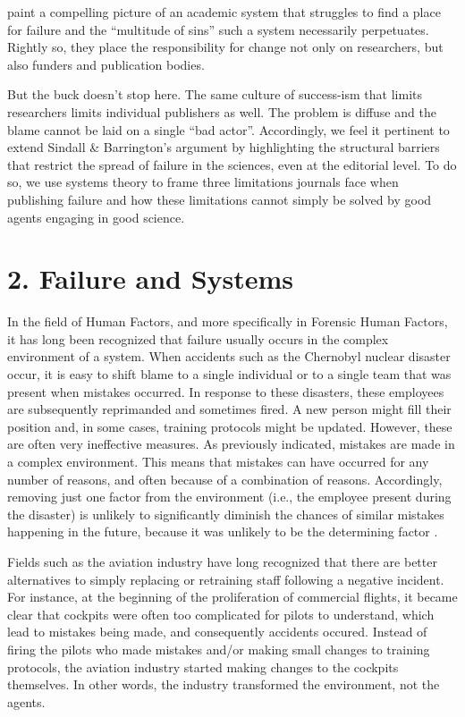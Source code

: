 \documentclass{article}
\begin{document}
\textcite{Sindall2020} paint a compelling picture of an academic system that struggles to find a place for failure and the “multitude of sins” such a system necessarily perpetuates. Rightly so, they place the responsibility for change not only on researchers, but also funders and publication bodies. 

But the buck doesn't stop here. The same culture of success-ism that limits researchers limits individual publishers as well. The problem is diffuse and the blame cannot be laid on a single “bad actor”. Accordingly, we feel it pertinent to extend Sindall \& Barrington's argument by highlighting the structural barriers that restrict the spread of failure in the sciences, even at the editorial level. To do so, we use systems theory to frame three limitations journals face when publishing failure and how these limitations cannot simply be solved by good agents engaging in good science. 



\section{2. Failure and Systems }

In the field of Human Factors, and more specifically in Forensic Human Factors, it has long been recognized that failure usually occurs in the complex environment of a system. When accidents such as the Chernobyl nuclear disaster occur, it is easy to shift blame to a single individual or to a single team that was present when mistakes occurred. In response to these disasters, these employees are subsequently reprimanded and sometimes fired. A new person might fill their position and, in some cases, training protocols might be updated. However, these are often very ineffective measures. As previously indicated, mistakes are made in a complex environment. This means that mistakes can have occurred for any number of reasons, and often because of a combination of reasons. Accordingly, removing just one factor from the environment (i.e., the employee present during the disaster) is unlikely to significantly diminish the chances of similar mistakes happening in the future, because it was unlikely to be the determining factor \parencite{Holden2009}. 

Fields such as the aviation industry have long recognized that there are better alternatives to simply replacing or retraining staff following a negative incident. For instance, at the beginning of the proliferation of commercial flights, it became clear that cockpits were often too complicated for pilots to understand, which lead to mistakes being made, and consequently accidents occured. Instead of firing the pilots who made mistakes and/or making small changes to training protocols, the aviation industry started making changes to the cockpits themselves. In other words, the industry transformed the environment, not the agents.
\end{document}
